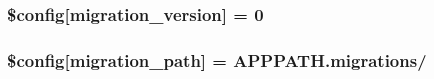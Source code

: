 \subsubsection[{\$config}]{\setlength{\rightskip}{0pt plus 5cm}\$config\mbox{[}\textquotesingle{}migration\+\_\+version\textquotesingle{}\mbox{]} = 0}\label{application_2config_2migration_8php_a53ca48939aaf8c92f0c0d239a294fff2}
\hypertarget{application_2config_2migration_8php_abc04383313304e348060a7ee39f5a8ee}{}
\subsubsection[{\$config}]{\setlength{\rightskip}{0pt plus 5cm}\$config\mbox{[}\textquotesingle{}migration\+\_\+path\textquotesingle{}\mbox{]} = A\+P\+P\+P\+A\+T\+H.\textquotesingle{}migrations/\textquotesingle{}}\label{application_2config_2migration_8php_abc04383313304e348060a7ee39f5a8ee}
